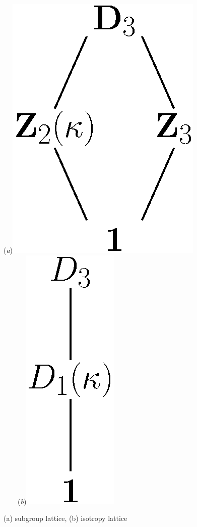 \begin{example}
\begin{figure}
\begin{center}
  (\textit{a})\includegraphics[height=0.15\textheight]{../figs/D3lattice}
~~~~(\textit{b})\includegraphics[height=0.15\textheight]{../figs/D3stablattice}
\end{center}
\caption[D3 lattices]{
    {\small
    (a)  subgroup lattice, (b)  isotropy lattice}}
\label{fig:D3lattice}
    \vspace*{-5pt}
\end{figure}


\end{example}

